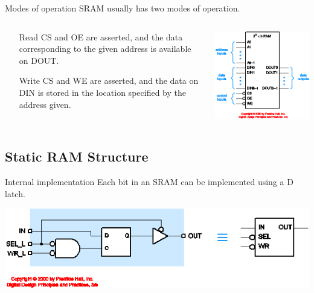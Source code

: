 \begin{frame}{Modes of operation}
  SRAM usually has two modes of operation.
  \begin{columns}
    \begin{column}{6cm}
      \begin{itemize}
        \item [Read] CS and OE are asserted, and the data corresponding to the given address is available on DOUT.
        \item [Write] CS and WE are asserted, and the data on DIN is stored in the location specified by the address given.
      \end{itemize}
    \end{column}
    \begin{column}{5cm}
      \begin{center}
        \includegraphics[scale=0.3]{SRAMSchematic}
      \end{center}
    \end{column}
  \end{columns}
\end{frame}

\subsection{Static RAM Structure}

\begin{frame}{Internal implementation}
  Each bit in an SRAM can be implemented using a D latch.\\
  \begin{center}
    \includegraphics[scale=0.4]{SRAMLogic}
  \end{center}
\end{frame}

